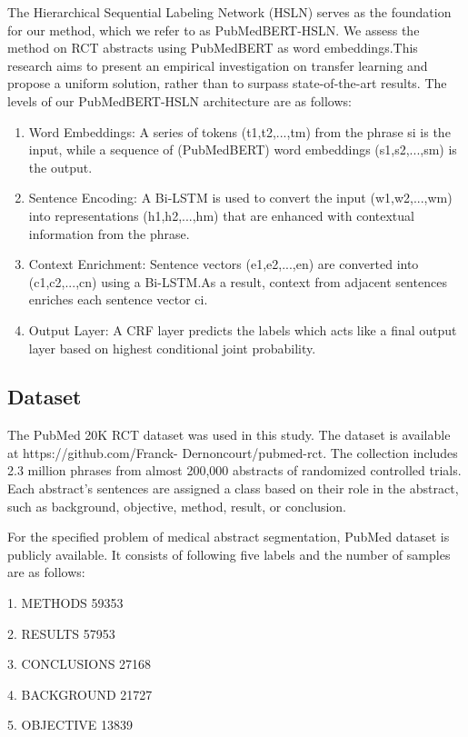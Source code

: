 \documentclass[conference]{IEEEtran}
\begin{document}
The Hierarchical Sequential Labeling Network (HSLN) serves as the foundation for our method, which we refer to as PubMedBERT-HSLN. We assess the method on RCT abstracts using PubMedBERT as word embeddings.This research aims to present an empirical investigation on transfer learning and propose a uniform solution, rather than to surpass state-of-the-art results. The levels of our PubMedBERT-HSLN architecture are as follows:
 \begin{enumerate}[label=\Roman*., itemsep=10pt]
    \item Word Embeddings:
          A series of tokens (t1,t2,...,tm) from the phrase si is the input, while a sequence of (PubMedBERT) word embeddings (s1,s2,...,sm) is the output.
    \item Sentence Encoding:
          A Bi-LSTM is used to convert the input (w1,w2,...,wm) into representations (h1,h2,...,hm) that are enhanced with contextual information from the phrase.
    \item Context Enrichment:
          Sentence vectors (e1,e2,...,en) are converted into (c1,c2,...,cn) using a Bi-LSTM.As a result, context from adjacent sentences enriches each sentence vector ci.
    \item Output Layer:
          A CRF layer predicts the labels which acts like a final output layer based on highest conditional joint probability.
    
\end{enumerate}
\subsection{Dataset}
The PubMed 20K RCT dataset was used in this study. The dataset is available at https://github.com/Franck- Dernoncourt/pubmed-rct.
The collection includes 2.3 million phrases from almost 200,000 abstracts of randomized controlled trials. Each abstract's sentences are assigned a class based on their role in the abstract, such as background, objective, method, result, or conclusion.


For the specified problem of medical abstract segmentation, PubMed dataset is publicly available. It consists of following five labels and the number of samples are as follows:

1. METHODS          59353

2. RESULTS          57953

3. CONCLUSIONS      27168

4. BACKGROUND       21727

5. OBJECTIVE        13839
\end{document}
